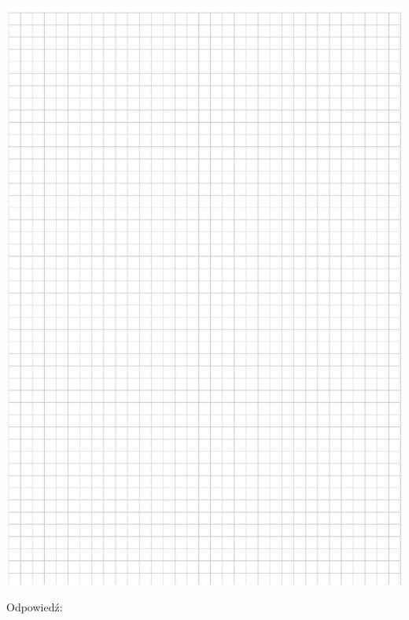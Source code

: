 \documentclass[10pt]{article}
\begin{document}
\includegraphics[max width=\textwidth, center]{2024_11_21_6a8be49478f78d0689cfg-15}

Odpowiedź:
\end{document}

